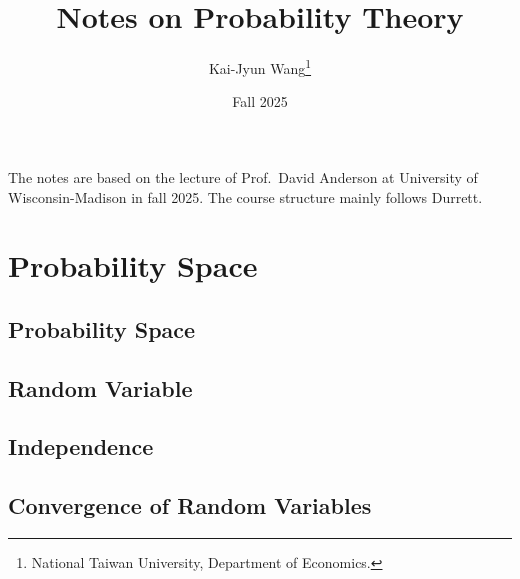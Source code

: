 \documentclass[a4paper, 12pt]{article}
\title{Notes on Probability Theory}
\author{Kai-Jyun Wang\thanks{National Taiwan University, Department of Economics.}}
\date{Fall 2025}
\begin{document}
 
\maketitle

The notes are based on the lecture of Prof.\ David Anderson at University of Wisconsin-Madison 
in fall 2025. The course structure mainly follows Durrett. 

\newpage 
\tableofcontents
\newpage

\section{Probability Space}
\subsection{Probability Space}

\newpage

\subsection{Random Variable}

\newpage

\subsection{Independence}

\newpage

\subsection{Convergence of Random Variables}

\newpage
\end{document}
